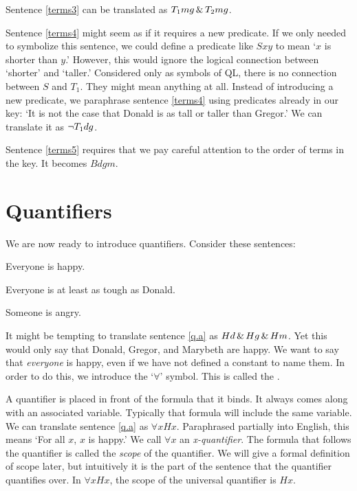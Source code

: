 Sentence \ref{terms3} can be translated as $T_1mg \,\&\, T_2mg$.

Sentence \ref{terms4} might seem as if it requires a new predicate. If we only needed to symbolize this sentence, we could define a predicate like $Sxy$ to mean `$x$ is shorter than $y$.' However, this would ignore the logical connection between `shorter' and `taller.' Considered only as symbols of QL, there is no connection between $S$ and $T_1$. They might mean anything at all. Instead of introducing a new predicate, we paraphrase sentence \ref{terms4} using predicates already in our key: `It is not the case that Donald is as tall or taller than Gregor.' We can translate it as $\neg T_1dg$.

Sentence \ref{terms5} requires that we pay careful attention to the order of terms in the key. It becomes $Bdgm$.






\section{Quantifiers}
We are now ready to introduce quantifiers. Consider these sentences:
\begin{earg}
\item[\ex{q.a}] Everyone is happy.
\item[\ex{q.ac}] Everyone is at least as tough as Donald.
\item[\ex{q.e}] Someone is angry.
\end{earg}

It might be tempting to translate sentence \ref{q.a} as $Hd \,\&\, Hg \,\&\, Hm$. Yet this would only say that Donald, Gregor, and Marybeth are happy. We want to say that \emph{everyone} is happy, even if we have not defined a constant to name them. In order to do this, we introduce the `$\forall$' symbol. This is called the .

A quantifier is placed in front of the formula that it binds. It always comes along with an associated variable. Typically that formula will include the same variable. We can translate sentence \ref{q.a} as $\forall x Hx$. Paraphrased partially into English, this means `For all $x$, $x$ is happy.'
We call $\forall x$ an \emph{x-quantifier}. The formula that follows the quantifier is called the \emph{scope} of the quantifier. We will give a formal definition of scope later, but intuitively it is the part of the sentence that the quantifier quantifies over. In $\forall x Hx$, the scope of the universal quantifier is $Hx$.

